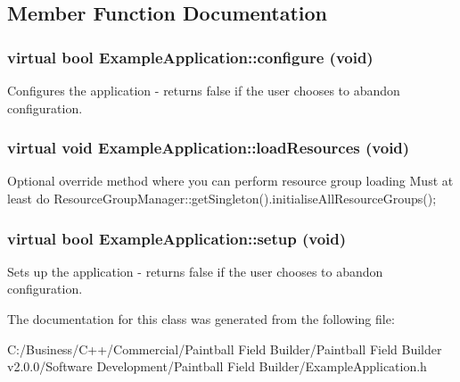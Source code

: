 \subsection{Member Function Documentation}
\hypertarget{class_example_application_a89afa78709beb837b1c8f0d6b81f9e30}{
\subsubsection[{configure}]{\setlength{\rightskip}{0pt plus 5cm}virtual bool ExampleApplication::configure (void)}}
\label{class_example_application_a89afa78709beb837b1c8f0d6b81f9e30}
Configures the application -\/ returns false if the user chooses to abandon configuration. \hypertarget{class_example_application_a3c5a3d3f81680b6ea0654dc561be2498}{
\subsubsection[{loadResources}]{\setlength{\rightskip}{0pt plus 5cm}virtual void ExampleApplication::loadResources (void)}}
\label{class_example_application_a3c5a3d3f81680b6ea0654dc561be2498}
Optional override method where you can perform resource group loading Must at least do ResourceGroupManager::getSingleton().initialiseAllResourceGroups(); \hypertarget{class_example_application_aa3432ea3ead8830abe277fa7bb2fed50}{
\subsubsection[{setup}]{\setlength{\rightskip}{0pt plus 5cm}virtual bool ExampleApplication::setup (void)}}
\label{class_example_application_aa3432ea3ead8830abe277fa7bb2fed50}
Sets up the application -\/ returns false if the user chooses to abandon configuration. 

The documentation for this class was generated from the following file:\begin{DoxyCompactItemize}
\item 
C:/Business/C++/Commercial/Paintball Field Builder/Paintball Field Builder v2.0.0/Software Development/Paintball Field Builder/ExampleApplication.h\end{DoxyCompactItemize}
